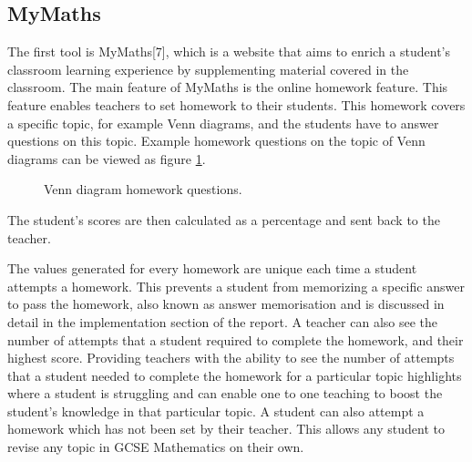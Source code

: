 \documentclass{article}
\begin{document}
\subsection{MyMaths}

The first tool is MyMaths[7], which is a website that aims to enrich a student's classroom learning experience by supplementing material covered in the classroom. The main feature of MyMaths is the online homework feature. This feature enables teachers to set homework to their students. This homework covers a specific topic, for example Venn diagrams, and the students have to answer questions on this topic. Example homework questions on the topic of Venn diagrams can be viewed as figure \ref{figure:mymathsHomeworkQuestion1}.
\begin{figure}[H]
	\centering
	\caption{Venn diagram homework questions.}
	\label{figure:mymathsHomeworkQuestion1}
\end{figure}
The student's scores are then calculated as a percentage and sent back to the teacher. \par

The values generated for every homework are unique each time a student attempts a homework. This prevents a student from memorizing a specific answer to pass the homework, also known as answer memorisation and is discussed in detail in the implementation section of the report. A teacher can also see the number of attempts that a student required to complete the homework, and their highest score. Providing teachers with the ability to see the number of attempts that a student needed to complete the homework for a particular topic highlights where a student is struggling and can enable one to one teaching to boost the student's knowledge in that particular topic. A student can also attempt a homework which has not been set by their teacher. This allows any student to revise any topic in GCSE Mathematics on their own. \par
\end{document}
